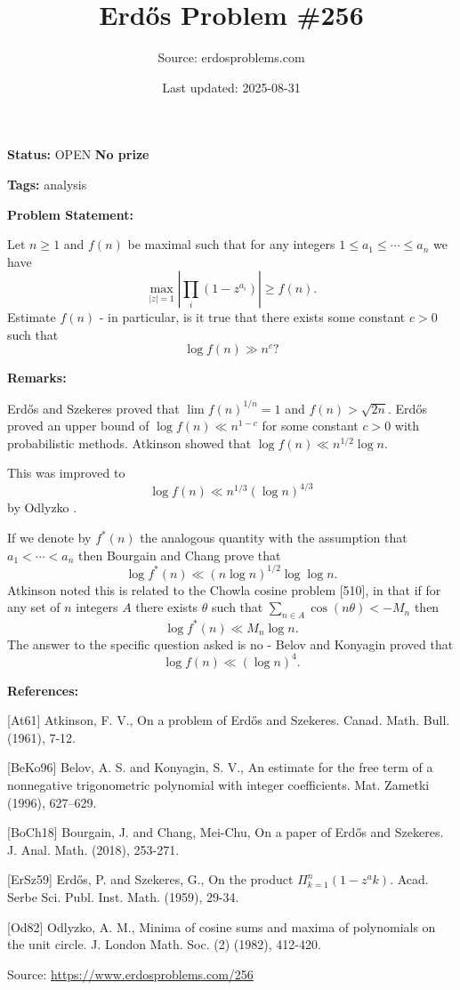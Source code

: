 \documentclass{article}
\title{Erd\H{o}s Problem \#256}
\date{Last updated: 2025-08-31}
\author{Source: erdosproblems.com}
\begin{document}
\maketitle

\noindent\textbf{Status:} OPEN \quad \textbf{No prize}

\noindent\textbf{Tags:} analysis

\medskip
\noindent\textbf{Problem Statement:}

Let $n\geq 1$ and $f(n)$ be maximal such that for any integers $1\leq a_1\leq \cdots \leq a_n$ we have\[\max_{\lvert z\rvert=1}\left\lvert \prod_{i}(1-z^{a_i})\right\rvert\geq f(n).\]Estimate $f(n)$ - in particular, is it true that there exists some constant $c>0$ such that\[\log f(n) \gg n^c?\]

\bigskip
\noindent\textbf{Remarks:}

Erd\H{o}s and Szekeres \cite{ErSz59} proved that $\lim f(n)^{1/n}=1$ and $f(n)>\sqrt{2n}$. Erd\H{o}s proved an upper bound of $\log f(n) \ll n^{1-c}$ for some constant $c>0$ with probabilistic methods. Atkinson \cite{At61} showed that $\log f(n) \ll n^{1/2}\log n$.

This was improved to\[\log f(n) \ll n^{1/3}(\log n)^{4/3}\]by Odlyzko \cite{Od82}.

If we denote by $f^*(n)$ the analogous quantity with the assumption that $a_1<\cdots<a_n$ then Bourgain and Chang \cite{BoCh18} prove that\[\log f^*(n)\ll (n\log n)^{1/2}\log\log n.\]Atkinson \cite{At61} noted this is related to the Chowla cosine problem [510], in that if for any set of $n$ integers $A$ there exists $\theta$ such that $\sum_{n\in A}\cos(n\theta) < -M_n$ then\[\log f^*(n) \ll M_n \log n.\]The answer to the specific question asked is no - Belov and Konyagin \cite{BeKo96} proved that\[\log f(n) \ll (\log n)^4.\]

\bigskip
\noindent\textbf{References:}

[At61] Atkinson, F. V., On a problem of Erd\H{o}s and Szekeres. Canad. Math. Bull. (1961), 7-12.
 
 [BeKo96] Belov, A. S. and Konyagin, S. V., An estimate for the free term of a nonnegative trigonometric
polynomial with integer coefficients. Mat. Zametki (1996), 627--629.
 
 [BoCh18] Bourgain, J. and Chang, Mei-Chu, On a paper of Erd\H{o}s and Szekeres. J. Anal. Math. (2018), 253-271.
 
 [ErSz59] Erd\H{o}s, P. and Szekeres, G., On the product $\Pi^n_{k=1}(1-z^ak)$. Acad. Serbe Sci. Publ. Inst. Math. (1959), 29-34.
 
 [Od82] Odlyzko, A. M., Minima of cosine sums and maxima of polynomials on the unit
circle. J. London Math. Soc. (2) (1982), 412-420.

\bigskip
\noindent\small{Source: \url{https://www.erdosproblems.com/256}}
\end{document}
